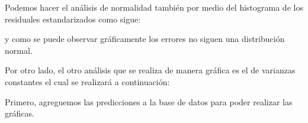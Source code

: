 \documentclass[
  12pt,
]{book}
\newenvironment{Shaded}{\begin{snugshade}}{\end{snugshade}}
\newcommand{\AttributeTok}[1]{\textcolor[rgb]{0.77,0.63,0.00}{#1}}
\newcommand{\DecValTok}[1]{\textcolor[rgb]{0.00,0.00,0.81}{#1}}
\newcommand{\FloatTok}[1]{\textcolor[rgb]{0.00,0.00,0.81}{#1}}
\newcommand{\FunctionTok}[1]{\textcolor[rgb]{0.00,0.00,0.00}{#1}}
\newcommand{\NormalTok}[1]{#1}
\newcommand{\SpecialCharTok}[1]{\textcolor[rgb]{0.00,0.00,0.00}{#1}}
\newcommand{\StringTok}[1]{\textcolor[rgb]{0.31,0.60,0.02}{#1}}
\begin{document}
Podemos hacer el análisis de normalidad también por medio del histograma de los residuales estandarizados como sigue:

\begin{Shaded}
\end{Shaded}

y como se puede observar gráficamente los errores no siguen una distribución normal.

Por otro lado, el otro análisis que se realiza de manera gráfica es el de varianzas constantes el cual se realizará a continuación:

Primero, agreguemos las predicciones a la base de datos para poder realizar las gráficas.
\end{document}
